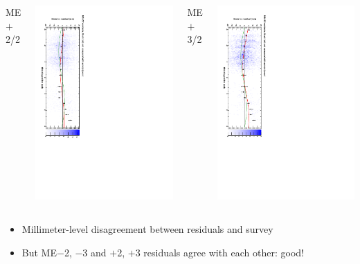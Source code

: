 \documentclass[compress]{beamer}
\begin{document}
\begin{frame}
\begin{columns}
ME$+$2/2

\includegraphics[height=\linewidth, angle=90]{datacsc_survey_mep22.pdf}

ME$+$3/2

\includegraphics[height=\linewidth, angle=90]{datacsc_survey_mep32.pdf}

\end{columns}

\vfill
\begin{itemize}
\item Millimeter-level disagreement between residuals and survey
\item But ME$-$2, $-$3 and $+$2, $+$3 residuals agree with each other: good!
\end{itemize}
\end{frame}
\end{document}
